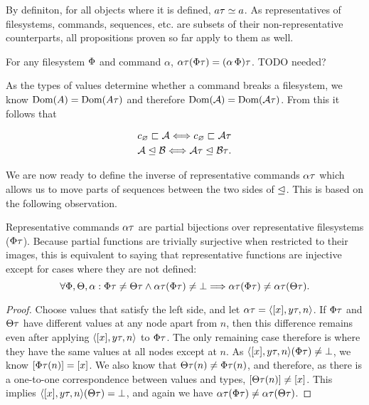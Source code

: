 By definiton, for all objects where it is defined, $a\tau\simeq a$.
As representatives of filesystems, commands, sequences, etc.
are subsets of their non-representative counterparts, 
all propositions proven so far apply to them as well.

\begin{mycor}\label{cor_typemap_transitive}
For any filesystem $\Phi$ and command $\alpha$, 
$\alpha\tau(\Phi\tau) = (\alpha\,\Phi)\tau$.
TODO needed?
\end{mycor}


As the types of values determine whether a command breaks a filesystem,
we know $\textrm{Dom}({A})=\textrm{Dom}({A\tau})$ and therefore $\textrm{Dom}({\mathcal{A}})=\textrm{Dom}({\mathcal{A}\tau})$.
From this it follows that

\begin{mycor}\label{repr_works_is_same}
\begin{gather*}
c_\varnothing\sqsubset{\mathcal{A}} \Longleftrightarrow c_\varnothing\sqsubset{\mathcal{A}\tau} \\
{\mathcal{A}}\trianglelefteq{\mathcal{B}} \Longleftrightarrow {\mathcal{A}\tau}\trianglelefteq{\mathcal{B}\tau}.
\end{gather*}
\end{mycor}


We are now ready to define the inverse of representative commands $\alpha\tau$
which allows us to move parts of sequences between the
two sides of $\trianglelefteq$.
This is based on the following observation.

\begin{mylem}\label{repr_comm_inject}
Representative commands $\alpha\tau$ are partial bijections over representative filesystems ($\Phi\tau$).
Because partial functions are trivially surjective when restricted to their images, this is
equivalent to saying that representative functions are injective except for cases
where they are not defined:
\[ \forall\Phi,\Theta,\alpha: \Phi\tau\neq\Theta\tau \wedge \alpha\tau(\Phi\tau)\neq\bot \Longrightarrow \alpha\tau(\Phi\tau) \neq \alpha\tau(\Theta\tau). \]
\end{mylem}
\begin{proof}
Choose values that satisfy the left side, and let $\alpha\tau = \langle{[x],{y}\tau,n}\rangle$.
If $\Phi\tau$ and $\Theta\tau$ have different values at any node apart from $n$, then this difference remains
even after applying $\langle{[x],{y}\tau,n}\rangle$ to $\Phi\tau$. 
The only remaining case therefore is where they have the same values
at all nodes except at $n$.
As $\langle{[x],{y}\tau,n}\rangle(\Phi\tau)\neq\bot$, we know $[\Phi\tau(n)]=[x]$.
We also know that $\Theta\tau(n)\neq\Phi\tau(n)$, and therefore, as there is a one-to-one correspondence between values and types,
$[\Theta\tau(n)]\neq[x]$.
This implies $\langle{[x],{y}\tau,n}\rangle(\Theta\tau)=\bot$,
and again we have $\alpha\tau(\Phi\tau) \neq \alpha\tau(\Theta\tau)$.
\end{proof}

